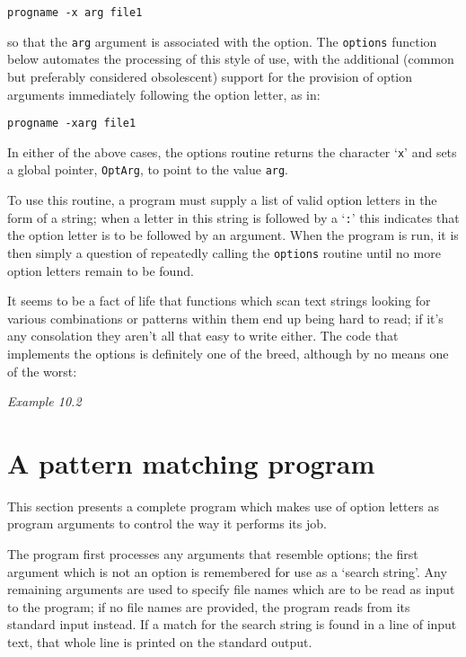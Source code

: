   \begin{Verbatim}
progname -x arg file1
\end{Verbatim}

  so that the \texttt{arg} argument is associated with the option. The
   \texttt{options} function below automates the processing of this style
   of use, with the additional (common but preferably considered obsolescent)
   support for the provision of option arguments immediately following the
   option letter, as in:


  \begin{Verbatim}
progname -xarg file1
\end{Verbatim}

  In either of the above cases, the options routine returns the character
   `\texttt{x}' and sets a global pointer, \texttt{OptArg}, to
   point to the value \texttt{arg}.


  To use this routine, a program must supply a list of valid option letters
   in the form of a string; when a letter in this string is followed by
   a `\texttt{:}' this indicates that the option letter is to be
   followed by an argument. When the program is run, it is then simply
   a question of repeatedly calling the \texttt{options} routine until no
   more option letters remain to be found.


  It seems to be a fact of life that functions which scan text strings
   looking for various combinations or patterns within them end up being hard
   to read; if it's any consolation they aren't all that easy to write either.
   The code that implements the options is definitely one of the breed,
   although by no means one of the worst:


  \begin{center}\textit{Example 10.2}\end{center}


 
        \section{A pattern matching program}
        

  

  This section presents a complete program which makes use of option letters
   as program arguments to control the way it performs its job.


  The program first processes any arguments that resemble options; the first
   argument which is not an option is remembered for use as a `search
   string'. Any remaining arguments are used to specify file names which are
   to be read as input to the program; if no file names are provided, the
   program reads from its standard input instead. If a match for the search
   string is found in a line of input text, that whole line is printed on the
   standard output.


